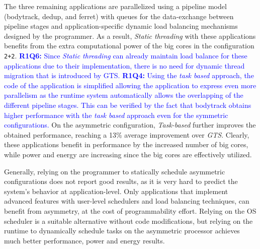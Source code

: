 The three remaining applications are parallelized using a pipeline model (bodytrack, dedup, and ferret)  with queues for the data-exchange between pipeline stages and application-specific dynamic load balancing mechanisms designed by the programmer.
As a result, \emph{Static threading} with these applications benefits from the extra computational power of the big cores in the configuration \texttt{2+2}. 
\textcolor{blue}{
\textbf{R1Q6:} Since \emph{Static threading} can already maintain load balance for these applications due to their implementation, there is no need for dynamic thread migration that is introduced by GTS.
}
\textcolor{blue}{
\textbf{R1Q4:} Using the \emph{task based} approach, the code of the application is simplified allowing the application to express even more parallelism as the runtime system automatically allows the overlapping of the different pipeline stages. 
This can be verified by the fact that bodytrack obtains higher performance with the \emph{task based} approach even for the symmetric configurations.
}
On the asymmetric configuration, \emph{Task-based} further improves the obtained performance, reaching a 13\% average improvement over \emph{GTS}. 
Clearly, these applications benefit in performance by the increased number of big cores, while power and energy are increasing since the big cores are effectively utilized.



Generally, relying on the programmer to statically schedule asymmetric configurations does not report good results, as it is very hard to predict the system's behavior at application-level. 
Only applications that implement advanced features with user-level schedulers and load balancing techniques, can benefit from asymmetry, at the cost of programmability effort.
Relying on the OS scheduler is a suitable alternative without code modifications, but relying on the runtime to dynamically schedule tasks on the asymmetric processor achieves much better performance, power and energy results.

